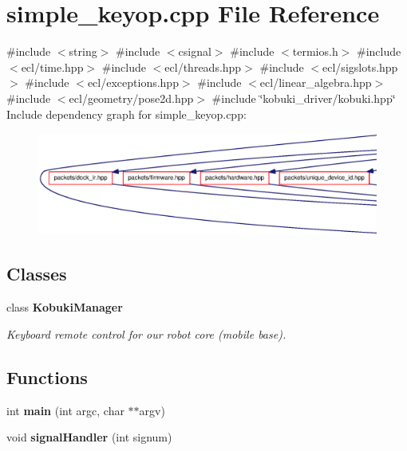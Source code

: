 \section{simple\-\_\-keyop.\-cpp \-File \-Reference}
\label{simple__keyop_8cpp}
{\ttfamily \#include $<$string$>$}\*
{\ttfamily \#include $<$csignal$>$}\*
{\ttfamily \#include $<$termios.\-h$>$}\*
{\ttfamily \#include $<$ecl/time.\-hpp$>$}\*
{\ttfamily \#include $<$ecl/threads.\-hpp$>$}\*
{\ttfamily \#include $<$ecl/sigslots.\-hpp$>$}\*
{\ttfamily \#include $<$ecl/exceptions.\-hpp$>$}\*
{\ttfamily \#include $<$ecl/linear\-\_\-algebra.\-hpp$>$}\*
{\ttfamily \#include $<$ecl/geometry/pose2d.\-hpp$>$}\*
{\ttfamily \#include \char`\"{}kobuki\-\_\-driver/kobuki.\-hpp\char`\"{}}\*
\-Include dependency graph for simple\-\_\-keyop.\-cpp\-:
\nopagebreak
\begin{figure}[H]
\begin{center}
\leavevmode
\includegraphics[width=350pt]{simple__keyop_8cpp__incl}
\end{center}
\end{figure}
\subsection*{\-Classes}
\begin{DoxyCompactItemize}
\item 
class {\bf \-Kobuki\-Manager}
\begin{DoxyCompactList}\small\item\em \-Keyboard remote control for our robot core (mobile base). \end{DoxyCompactList}\end{DoxyCompactItemize}
\subsection*{\-Functions}
\begin{DoxyCompactItemize}
\item 
int {\bf main} (int argc, char $\ast$$\ast$argv)
\item 
void {\bf signal\-Handler} (int signum)
\end{DoxyCompactItemize}
